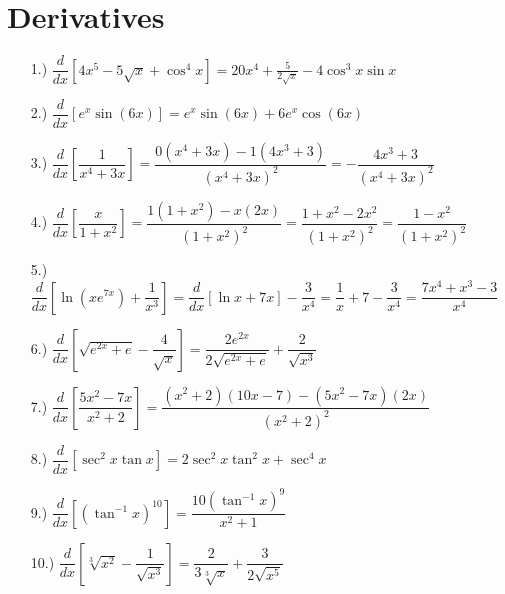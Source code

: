 \documentclass[12pt]{article}
\newcommand{\bracks}[1]{\left[#1\right]}
\newcommand{\derv}[1]{\dfrac{d}{d#1}}
\begin{document}
\pagestyle{fancy}

\normalsize
\section*{Derivatives}
\begin{itemize}
    \item [1.)] $\dfrac{d}{dx}\bracks{4x^5-5\sqrt{x}+\cos^4x}=20x^4+\frac{5}{2\sqrt{x}}-4\cos^3x\sin x$

    \item [2.)] $\dfrac{d}{dx}\bracks{e^x\sin(6x)}=e^x\sin(6x)+6e^x\cos(6x)$

    \item [3.)] $\dfrac{d}{dx}\bracks{\dfrac{1}{x^4+3x}}=\dfrac{0(x^4+3x)-1(4x^3+3)}{(x^4+3x)^2}=-\dfrac{4x^3+3}{(x^4+3x)^2}$

    \item [4.)] $\dfrac{d}{dx}\bracks{\dfrac{x}{1+x^2}}=\dfrac{1(1+x^2)-x(2x)}{(1+x^2)^2}=\dfrac{1+x^2-2x^2}{(1+x^2)^2}=\dfrac{1-x^2}{(1+x^2)^2}$

    \item [5.)] $\dfrac{d}{dx}\bracks{\ln(xe^{7x})+\dfrac{1}{x^3}}=\dfrac{d}{dx}\bracks{\ln x+7x}-\dfrac{3}{x^4}=\dfrac{1}{x}+7-\dfrac{3}{x^4}=\dfrac{7x^4+x^3-3}{x^4}$

    \item [6.)] $\dfrac{d}{dx}\bracks{\sqrt{e^{2x}+e}-\dfrac{4}{\sqrt{x}}}=\dfrac{2e^{2x}}{2\sqrt{e^{2x}+e}}+\dfrac{2}{\sqrt{x^3}}$

    \item [7.)] $\derv{x}\bracks{\dfrac{5x^2-7x}{x^2+2}}=\dfrac{(x^2+2)(10x-7)-(5x^2-7x)(2x)}{(x^2+2)^2}$

    \item [8.)] $\dfrac{d}{dx}\bracks{\sec^2 x\tan x}=2\sec^2 x\tan^2 x+\sec^4 x$

    \item [9.)] $\derv{x}\bracks{(\tan^{-1}x)^{10}}=\dfrac{10(\tan^{-1}x)^9}{x^2+1}$

    \item [10.)] $\derv{x}\bracks{\sqrt[3]{x^2}-\dfrac{1}{\sqrt{x^3}}}=\dfrac{2}{3\sqrt[3]{x}}+\dfrac{3}{2\sqrt{x^5}}$
\end{itemize}
\end{document}
